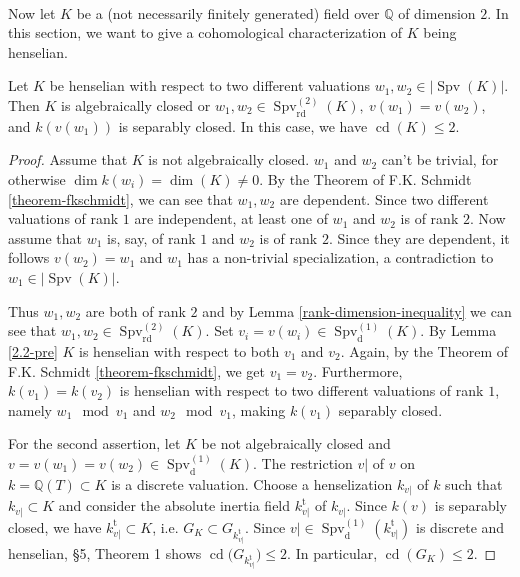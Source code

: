 \paragraph{} Now let $K$ be a (not necessarily finitely generated) field over $\mathbb{Q}$ of dimension $2$. In this section, we want to give a cohomological characterization of $K$ being henselian.

\begin{lemma}\label{2.2}
Let $K$ be henselian with respect to two different valuations $w_1,w_2\in |\operatorname{Spv}(K)|$. Then $K$ is algebraically closed or $w_1,w_2\in\operatorname{Spv}_\text{rd}^{(2)}(K),\ v(w_1)=v(w_2)$, and $k(v(w_1))$ is separably closed. In this case, we have $\operatorname{cd}(K)\leq 2$.
\end{lemma}

\begin{proof}
Assume that $K$ is not algebraically closed. $w_1$ and $w_2$ can't be trivial, for otherwise $\dim k(w_i)=\dim (K)\neq 0$. By the Theorem of F.K. Schmidt \ref{theorem-fkschmidt}, we can see that $w_1,w_2$ are dependent. Since two different valuations of rank $1$ are independent, at least one of $w_1$ and $w_2$ is of rank $2$. Now assume that $w_1$ is, say, of rank $1$ and $w_2$ is of rank $2$. Since they are dependent, it follows $v(w_2) = w_1$ and $w_1$ has a non-trivial specialization, a contradiction to $w_1\in |\operatorname{Spv}(K)|$.

Thus $w_1,w_2$ are both of rank $2$ and by Lemma \ref{rank-dimension-inequality} we can see that $w_1,w_2\in\operatorname{Spv}_\text{rd}^{(2)}(K)$. Set $v_i=v(w_i)\in\operatorname{Spv}^{(1)}_\text{d}(K)$. By Lemma \ref{2.2-pre} $K$ is henselian with respect to both $v_1$ and $v_2$. Again, by the Theorem of F.K. Schmidt \ref{theorem-fkschmidt}, we get $v_1 = v_2$. Furthermore, $k(v_1) = k(v_2)$ is henselian with respect to two different valuations of rank $1$, namely $w_1\mod v_1$ and $w_2\mod v_1$, making $k(v_1)$ separably closed.

For the second assertion, let $K$ be not algebraically closed and $v=v(w_1)=v(w_2)\in\operatorname{Spv}_\text{d}^{(1)}(K)$. The restriction $v|$ of $v$ on $k=\mathbb{Q}(T)\subset K$ is a discrete valuation. Choose a henselization $k_{v|}$ of $k$ such that $k_{v|}\subset K$ and consider the absolute inertia field $k_{v|}^\text{t}$ of $k_{v|}$. Since $k(v)$ is separably closed, we have $k_{v|}^\text{t}\subset K$, i.e. $G_K\subset G_{k_{v|}^\text{t}}$. Since $v|\in \operatorname{Spv}_\text{d}^{(1)} ({k_{v|}^\text{t}})$ is discrete and henselian, \cite{Ka79} §5, Theorem 1 shows $\operatorname{cd}\big(G_{k_{v|}^\text{t}}\big)\leq 2$. In particular, $\operatorname{cd}(G_K)\leq 2$.
\end{proof}

